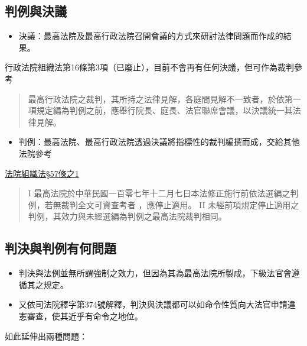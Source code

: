 \documentclass[
]{book}
\providecommand{\tightlist}{%
  \setlength{\itemsep}{0pt}\setlength{\parskip}{0pt}}
\begin{document}
\pagebreak

\hypertarget{ux5224ux4f8bux8207ux6c7aux8b70}{%
\subsection{判例與決議}\label{ux5224ux4f8bux8207ux6c7aux8b70}}

\begin{itemize}
\tightlist
\item
  決議：最高法院及最高行政法院召開會議的方式來研討法律問題而作成的結果。
\end{itemize}

行政法院組織法第16條第3項（已廢止），目前不會再有任何決議，但可作為裁判參考

\begin{quote}
最高行政法院之裁判，其所持之法律見解，各庭間見解不一致者，於依第一項規定編為判例之前，應舉行院長、庭長、法官聯席會議，以決議統一其法律見解。
\end{quote}

\begin{itemize}
\tightlist
\item
  判例：最高法院、最高行政法院透過決議將指標性的裁判編撰而成，交給其他法院參考
\end{itemize}

\href{https://law.moj.gov.tw/LawClass/LawSingle.aspx?pcode=A0010053\&flno=57-1}{法院組織法§57條之1}

\begin{quote}
I 最高法院於中華⺠國一百零七年十二月七日本法修正施行前依法選編之判例，若無裁判全文可資查考者 ，應停止適用。
II 未經前項規定停止適用之判例，其效力與未經選編為判例之最高法院裁判相同。
\end{quote}

\hypertarget{ux5224ux6c7aux8207ux5224ux4f8bux6709ux4f55ux554fux984c}{%
\subsection{判決與判例有何問題}\label{ux5224ux6c7aux8207ux5224ux4f8bux6709ux4f55ux554fux984c}}

\begin{itemize}
\item
  判決與法例並無所謂強制之效力，但因為其為最高法院所製成，下級法官會遵循其之規定。
\item
  又依司法院釋字第374號解釋，判決與決議都可以如命令性質向大法官申請違憲審查，使其近乎有命令之地位。
\end{itemize}

如此延伸出兩種問題：
\end{document}
